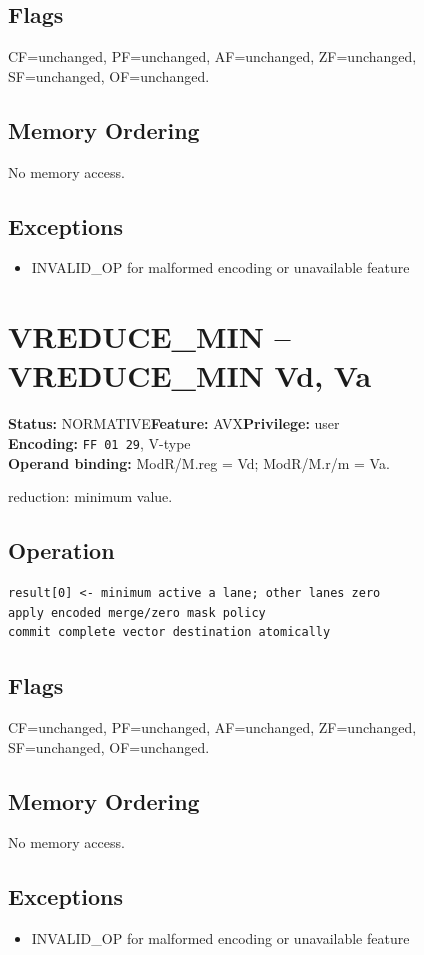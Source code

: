 \documentclass[10pt]{article}
\begin{document}
\subsection*{Flags}
CF=unchanged, PF=unchanged, AF=unchanged, ZF=unchanged, SF=unchanged, OF=unchanged.
\subsection*{Memory Ordering}
No memory access.
\subsection*{Exceptions}
\begin{itemize}
\item INVALID\_OP for malformed encoding or unavailable feature
\end{itemize}
\clearpage

\section{VREDUCE\_MIN -- VREDUCE\_MIN Vd, Va}
\textbf{Status:} NORMATIVE\quad \textbf{Feature:} AVX\quad \textbf{Privilege:} user\\
\textbf{Encoding:} \texttt{FF 01 29}, V-type\\
\textbf{Operand binding:} ModR/M.reg = Vd; ModR/M.r/m = Va.

reduction: minimum value.

\subsection*{Operation}
\begin{lstlisting}
result[0] <- minimum active a lane; other lanes zero
apply encoded merge/zero mask policy
commit complete vector destination atomically
\end{lstlisting}
\subsection*{Flags}
CF=unchanged, PF=unchanged, AF=unchanged, ZF=unchanged, SF=unchanged, OF=unchanged.
\subsection*{Memory Ordering}
No memory access.
\subsection*{Exceptions}
\begin{itemize}
\item INVALID\_OP for malformed encoding or unavailable feature
\end{itemize}
\clearpage
\end{document}
